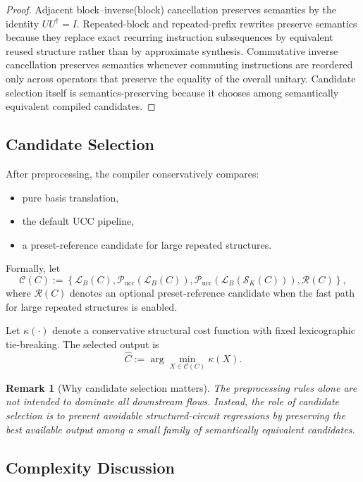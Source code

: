 \documentclass[11pt]{article}
\newtheorem{remark}{Remark}
\begin{document}
\begin{proof}
Adjacent block--inverse(block) cancellation preserves semantics by the identity $U U^\dagger = I$. Repeated-block and repeated-prefix rewrites preserve semantics because they replace exact recurring instruction subsequences by equivalent reused structure rather than by approximate synthesis. Commutative inverse cancellation preserves semantics whenever commuting instructions are reordered only across operators that preserve the equality of the overall unitary. Candidate selection itself is semantics-preserving because it chooses among semantically equivalent compiled candidates.
\end{proof}

\subsection{Candidate Selection}

After preprocessing, the compiler conservatively compares:
\begin{itemize}[leftmargin=1.5em]
    \item pure basis translation,
    \item the default UCC pipeline,
    \item a preset-reference candidate for large repeated structures.
\end{itemize}

Formally, let
\[
\mathcal{C}(C) :=
\left\{
\mathcal{L}_B(C),
\mathcal{P}_{\mathrm{ucc}}(\mathcal{L}_B(C)),
\mathcal{P}_{\mathrm{ucc}}(\mathcal{L}_B(\mathcal{S}_K(C))),
\mathcal{R}(C)
\right\},
\]
where $\mathcal{R}(C)$ denotes an optional preset-reference candidate when the fast path for large repeated structures is enabled.

Let $\kappa(\cdot)$ denote a conservative structural cost function with fixed lexicographic tie-breaking. The selected output is
\[
\widehat{C} := \arg\min_{X \in \mathcal{C}(C)} \kappa(X).
\]

\begin{remark}[Why candidate selection matters]
The preprocessing rules alone are not intended to dominate all downstream flows. Instead, the role of candidate selection is to prevent avoidable structured-circuit regressions by preserving the best available output among a small family of semantically equivalent candidates.
\end{remark}

\subsection{Complexity Discussion}
\end{document}
